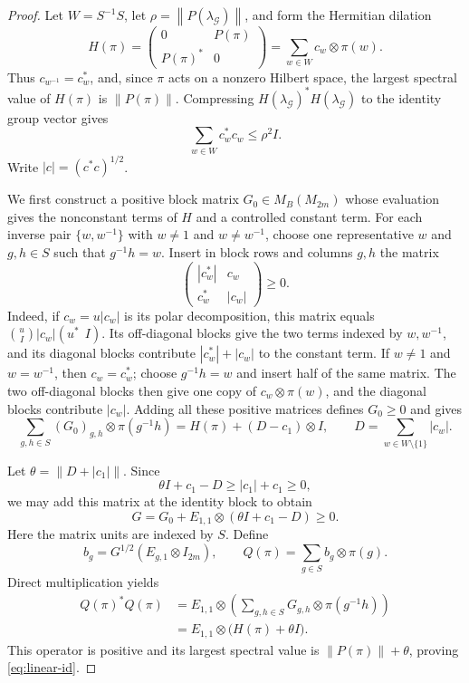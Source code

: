 \documentclass[11pt]{article}
\numberwithin{equation}{section}
\theoremstyle{boldremark}\newtheorem{remark}[theorem]{Remark}
\newcommand{\M}{M}
\newcommand{\norm}[1]{\left\lVert #1\right\rVert}
\begin{document}
\begin{proof}
Let $W=S^{-1}S$, let $\rho=\norm{P(\lambda_{\mathcal G})}$, and form the
Hermitian dilation
\[
 H(\pi)=\begin{pmatrix}0&P(\pi)\\P(\pi)^*&0\end{pmatrix}
       =\sum_{w\in W}c_w\otimes\pi(w).
\]
Thus $c_{w^{-1}}=c_w^*$, and, since $\pi$ acts on a nonzero Hilbert
space, the largest spectral value of $H(\pi)$ is $\norm{P(\pi)}$.
Compressing $H(\lambda_{\mathcal G})^*H(\lambda_{\mathcal G})$ to the
identity group vector gives
\begin{equation}
 \sum_{w\in W}c_w^*c_w\le\rho^2I.
 \label{eq:coeff-bound}
\end{equation}
Write $|c|=(c^*c)^{1/2}$.

We first construct a positive block matrix $G_0\in\M_B(\M_{2m})$
whose evaluation gives the nonconstant terms of $H$ and a controlled
constant term. For each inverse pair $\{w,w^{-1}\}$ with
$w\ne1$ and $w\ne w^{-1}$, choose one representative $w$ and
$g,h\in S$ such that $g^{-1}h=w$. Insert in block rows and columns
$g,h$ the matrix
\[
 \begin{pmatrix}|c_w^*|&c_w\\c_w^*&|c_w|\end{pmatrix}\ge0.
\]
Indeed, if $c_w=u|c_w|$ is its polar decomposition, this matrix equals
$\binom{u}{I}|c_w|(u^*\ \ I)$.
Its off-diagonal blocks give the two terms indexed by $w,w^{-1}$,
and its diagonal blocks contribute $|c_w^*|+|c_w|$ to the constant
term. If $w\ne1$ and $w=w^{-1}$, then $c_w=c_w^*$; choose
$g^{-1}h=w$ and insert half of the same matrix. The two off-diagonal
blocks then give one copy of $c_w\otimes\pi(w)$, and the diagonal
blocks contribute $|c_w|$.
Adding all these positive matrices defines $G_0\ge0$ and gives
\[
 \sum_{g,h\in S}(G_0)_{g,h}\otimes\pi(g^{-1}h)
 =H(\pi)+(D-c_1)\otimes I,
 \qquad D=\sum_{w\in W\setminus\{1\}}|c_w|.
\]

Let $\theta=\norm{D+|c_1|}$. Since
\[
 \theta I+c_1-D\ge |c_1|+c_1\ge0,
\]
we may add this matrix at the identity block to obtain
\[
 G=G_0+E_{1,1}\otimes(\theta I+c_1-D)\ge0.
\]
Here the matrix units are indexed by $S$.
Define
\[
 b_g=G^{1/2}(E_{g,1}\otimes I_{2m}),\qquad
 Q(\pi)=\sum_{g\in S}b_g\otimes\pi(g).
\]
Direct multiplication yields
\begin{align*}
 Q(\pi)^*Q(\pi)
 &=E_{1,1}\otimes
   \left(\sum_{g,h\in S}G_{g,h}\otimes\pi(g^{-1}h)\right)\\
 &=E_{1,1}\otimes\bigl(H(\pi)+\theta I\bigr).
\end{align*}
This operator is positive and its largest spectral value is
$\norm{P(\pi)}+\theta$, proving \eqref{eq:linear-id}.


\end{proof}
\end{document}
